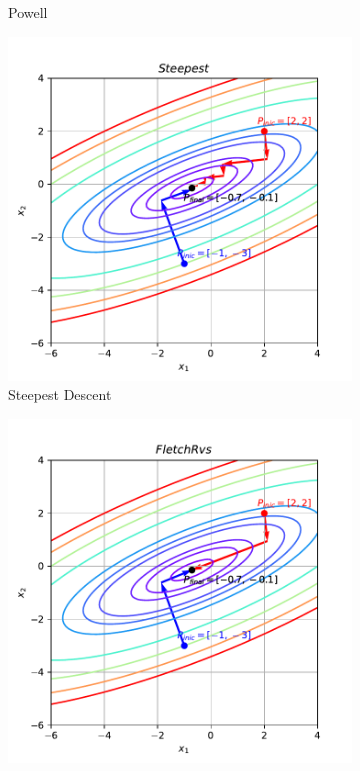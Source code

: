 \documentclass[10pt, a4paper]{article}
\begin{document}
\begin{figure}[htpb]
\begin{subfigure}[b]{0.32\textwidth}
    \caption{Powell}
    \label{fig:q1a_powell}
  \end{subfigure}
  \hfill
  \begin{subfigure}[b]{0.32\textwidth}
    \centering
    \includegraphics[width=\textwidth]{images/q1a_Steepest.pdf}
    \caption{Steepest Descent}
    \label{fig:q1a_steepest}
  \end{subfigure}
  \hfill
  \begin{subfigure}[b]{0.32\textwidth}
    \centering
    \includegraphics[width=\textwidth]{images/q1a_FletchRvs.pdf}

\end{subfigure}
\end{figure}
\end{document}
